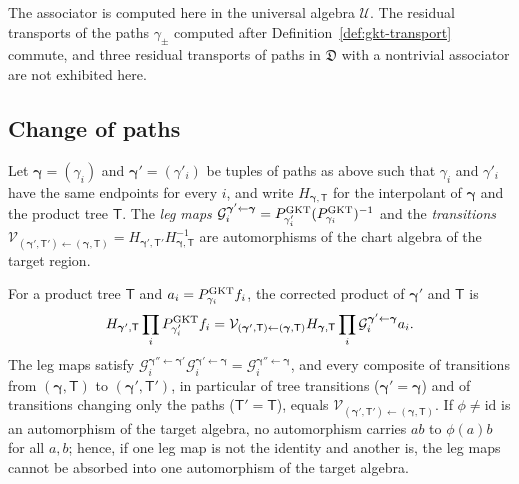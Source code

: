 The associator is computed here in the universal algebra $\mathcal U$.  The
residual transports of the paths $\gamma_\pm$ computed after
Definition~\ref{def:gkt-transport} commute, and three residual transports of
paths in $\mathfrak D$ with a nontrivial associator are not exhibited here.

\subsection{Change of paths}

Let $\boldsymbol\gamma=(\gamma_i)$ and $\boldsymbol\gamma'=(\gamma'_i)$ be
tuples of paths as above such that $\gamma_i$ and $\gamma'_i$ have the same
endpoints for every $i$, and write $H_{\boldsymbol\gamma,\mathsf T}$ for the
interpolant of $\boldsymbol\gamma$ and the product tree $\mathsf T$.  The
\emph{leg maps} $\mathcal G_i^{\boldsymbol\gamma'\leftarrow\boldsymbol\gamma}
=P^{\mathrm{GKT}}_{\gamma'_i}(P^{\mathrm{GKT}}_{\gamma_i})^{-1}$ and the \emph{transitions}
$\mathcal V_{(\boldsymbol\gamma',\mathsf T')\leftarrow(\boldsymbol\gamma,\mathsf T)}
=H_{\boldsymbol\gamma',\mathsf T'}H_{\boldsymbol\gamma,\mathsf T}^{-1}$ are
automorphisms of the chart algebra of the target region.

\begin{proposition}
\label{prop:corridor-groupoid}
For a product tree $\mathsf T$ and $a_i=P^{\mathrm{GKT}}_{\gamma_i}f_i$, the
corrected product of $\boldsymbol\gamma'$ and $\mathsf T$ is
\begin{equation}\label{eq:corridor-square}
 H_{\boldsymbol\gamma',\mathsf T}\prod_iP^{\mathrm{GKT}}_{\gamma'_i}f_i
 =\mathcal V_{(\boldsymbol\gamma',\mathsf T)\leftarrow(\boldsymbol\gamma,\mathsf T)}
  H_{\boldsymbol\gamma,\mathsf T}
  \prod_i\mathcal G_i^{\boldsymbol\gamma'\leftarrow\boldsymbol\gamma}a_i.
\end{equation}
The leg maps satisfy
$\mathcal G_i^{\boldsymbol\gamma''\leftarrow\boldsymbol\gamma'}
\mathcal G_i^{\boldsymbol\gamma'\leftarrow\boldsymbol\gamma}
=\mathcal G_i^{\boldsymbol\gamma''\leftarrow\boldsymbol\gamma}$, and every
composite of transitions from $(\boldsymbol\gamma,\mathsf T)$ to
$(\boldsymbol\gamma',\mathsf T')$, in particular of tree transitions
($\boldsymbol\gamma'=\boldsymbol\gamma$) and of transitions changing only
the paths ($\mathsf T'=\mathsf T$), equals
$\mathcal V_{(\boldsymbol\gamma',\mathsf T')\leftarrow(\boldsymbol\gamma,\mathsf T)}$.
If $\phi\neq\mathrm{id}$ is an automorphism of the target algebra, no
automorphism carries $ab$ to $\phi(a)b$ for all $a,b$; hence, if one leg map
is not the identity and another is, the leg maps cannot be absorbed into one
automorphism of the target algebra.
\end{proposition}

